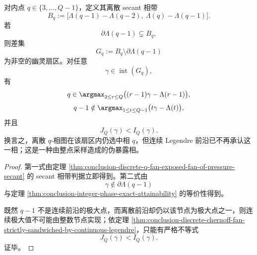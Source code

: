 \begin{theorem}[幽灵扇区]\label{thm:conclusion-ghost-sector-for-discrete-secant-fan}
对内点 \(q\in\{3,\dots,Q-1\}\)，定义其离散 secant 相带
\[
B_q:=
\bigl[\Lambda(q-1)-\Lambda(q-2),\ \Lambda(q)-\Lambda(q-1)\bigr].
\]
若
\[
\partial \Lambda(q-1)\subsetneq B_q,
\]
则差集
\[
G_q:=B_q\setminus \partial \Lambda(q-1)
\]
为非空的幽灵扇区。对任意
\[
\gamma\in \operatorname{int}(G_q),
\]
有
\[
q\in \argmax_{2\le r\le Q}\bigl((r-1)\gamma-\Lambda(r-1)\bigr),
\]
\[
q-1\notin \argmax_{1\le t\le Q-1}\bigl(t\gamma-\Lambda(t)\bigr),
\]
并且
\[
J_Q(\gamma)<I_Q(\gamma).
\]
换言之，离散 \(q\)-相图在该扇区内仍选中相 \(q\)，但连续 Legendre 前沿已不再承认这一相；这是一种由整点采样造成的伪暴露相。
\end{theorem}
\begin{proof}
第一式由定理 \ref{thm:conclusion-discrete-q-fan-exposed-fan-of-pressure-secant} 的 secant 相带判据立即得到。第二式由
\[
\gamma\notin\partial\Lambda(q-1)
\]
与定理 \ref{thm:conclusion-integer-phase-exact-attainability} 的等价性得到。

既然 \(q-1\) 不是连续前沿的极大点，而离散前沿却仍以该节点为极大点之一，则连续极大值不可能由整数节点实现；依定理 \ref{thm:conclusion-discrete-chernoff-fan-strictly-sandwiched-by-continuous-legendre}，只能有严格不等式
\[
J_Q(\gamma)<I_Q(\gamma).
\]
证毕。
\end{proof}

